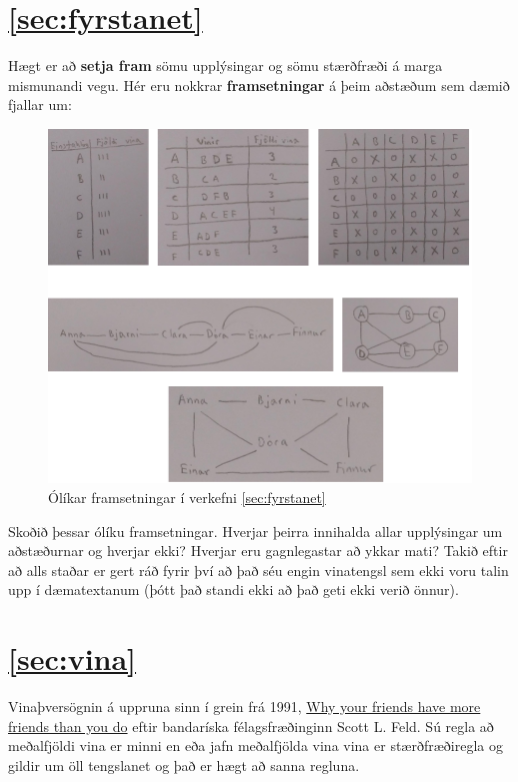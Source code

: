 \documentclass[b5paper,12pt]{book}
\begin{document}
\section*{\ref{sec:fyrstanet}}
Hægt er að \textbf{setja fram} sömu upplýsingar og sömu stærðfræði á marga mismunandi vegu. Hér eru nokkrar \textbf{framsetningar} á þeim aðstæðum sem dæmið fjallar um:
    \begin{figure}[h]
  \includegraphics[scale=0.5, center]{Myndir/Fyrstunet.png}
  \caption*{Ólíkar framsetningar í verkefni \ref{sec:fyrstanet}}
\end{figure}
Skoðið þessar ólíku framsetningar. Hverjar þeirra innihalda allar upplýsingar um aðstæðurnar og hverjar ekki? Hverjar eru gagnlegastar að ykkar mati? Takið eftir að alls staðar er gert ráð fyrir því að það séu engin vinatengsl sem ekki voru talin upp í dæmatextanum (þótt það standi ekki að það geti ekki verið önnur).

\section*{\ref{sec:vina}}
Vinaþversögnin á uppruna sinn í grein frá 1991, \href{https://dx.doi.org/10.1086\%2F229693}{Why your friends have more friends than you do} eftir bandaríska félagsfræðinginn Scott L. Feld. Sú regla að meðalfjöldi vina er minni en eða jafn meðalfjölda vina vina er stærðfræðiregla og gildir um öll tengslanet og það er hægt að sanna regluna.
\end{document}
